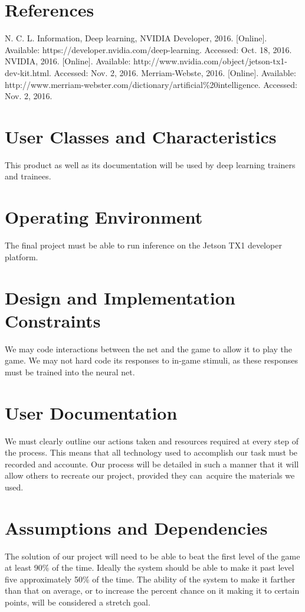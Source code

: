 \documentclass{scrreprt}
\begin{document}
\section{References}
N. C. L. Information, Deep learning, NVIDIA Developer, 2016. [Online]. Available: https://developer.nvidia.com/deep-learning. Accessed: Oct. 18, 2016.
NVIDIA, 2016. [Online]. Available: http://www.nvidia.com/object/jetson-tx1-dev-kit.html. Accessed: Nov. 2, 2016.
Merriam-Webste, 2016. [Online]. Available: http://www.merriam-webster.com/dictionary/artificial\%20intelligence. Accessed: Nov. 2, 2016.

\section{User Classes and Characteristics}
This product as well as its documentation will be used by deep learning trainers and trainees.

\section{Operating Environment}
The final project must be able to run inference on the Jetson TX1 developer platform.

\section{Design and Implementation Constraints}
We may code interactions between the net and the game to allow it to play the game.
We may not hard code its responses to in-game stimuli, as these responses must be trained into the neural net.

\section{User Documentation}
We must clearly outline our actions taken and resources required at every step of the process.
This means that all technology used to accomplish our task must be recorded and accounte.
Our process will be detailed in such a manner that it will allow others to recreate our project, provided they can\
 acquire the materials we used.

\section{Assumptions and Dependencies}
The solution of our project will need to be able to beat the first level of the game at least 90\% of the time.
Ideally the system should be able to make it past level five approximately 50\% of the time.
The ability of the system to make it farther than that on average, or to increase the percent chance on it making it to certain points, will be considered a stretch goal.
\end{document}
